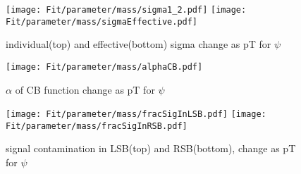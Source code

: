 \documentclass[12pt]{article}
\begin{document}
\begin{figure}[htbp]
\centering
\texttt{[image: Fit/parameter/mass/sigma1\_2.pdf]}
\texttt{[image: Fit/parameter/mass/sigmaEffective.pdf]}
\caption{individual(top) and effective(bottom) sigma change as pT for $\psi$}
\end{figure}
\clearpage

\begin{figure}[htbp]
\centering
\texttt{[image: Fit/parameter/mass/alphaCB.pdf]}
\caption{$\alpha$ of CB function change as pT for $\psi$}
\texttt{[image: Fit/parameter/mass/fracSigInLSB.pdf]}
\texttt{[image: Fit/parameter/mass/fracSigInRSB.pdf]}
\caption{signal contamination in LSB(top) and RSB(bottom), change as pT for $\psi$}
\end{figure}
\clearpage
\end{document}
